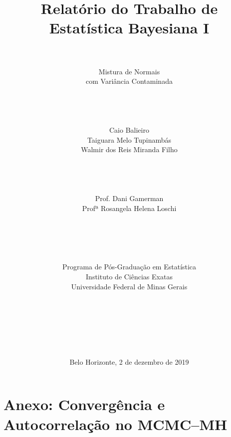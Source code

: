 \documentclass[12pt,reqno,a4paper,oneside]{article}
\begin{document}
\title{\huge Relatório do Trabalho de\\
	Estatística Bayesiana I}
\author{\\
	\\
	\huge Mistura de Normais\\
	\huge com Variância Contaminada\\
	\\
	\\
	\\
	\\
	\Large Caio Balieiro\\
	\Large Taiguara Melo Tupinambás\\
	\Large Walmir dos Reis Miranda Filho\\
	\\
	\\
	\\
	\\
	\Large Prof. Dani Gamerman\\
	\Large Profª Rosangela Helena Loschi\\
	\\
	\\
	\\
	\\
	\\
	Programa de Pós-Graduação em Estatística\\
	Instituto de Ciências Exatas\\
	Universidade Federal de Minas Gerais\\
	\\
	\\
	\\
	\\
	\\
	\\}
\date{Belo Horizonte, 2 de dezembro de 2019}
\maketitle

\newpage










\newpage



\newpage

\section*{Anexo: Convergência e Autocorrelação no MCMC--MH}
\end{document}
